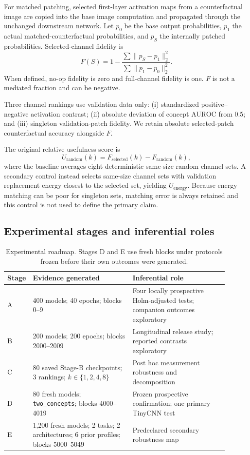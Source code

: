 \documentclass[10pt]{article}
\begin{document}
For matched patching, selected first-layer activation maps from a counterfactual image are copied into the base image computation and propagated through the unchanged downstream network. Let $p_0$ be the base output probabilities, $p_1$ the actual matched-counterfactual probabilities, and $p_S$ the internally patched probabilities. Selected-channel fidelity is
\[
F(S)=1-\frac{\sum\lVert p_S-p_1\rVert_2^2}
{\sum\lVert p_1-p_0\rVert_2^2}.
\]
When defined, no-op fidelity is zero and full-channel fidelity is one. $F$ is not a mediated fraction and can be negative.

Three channel rankings use validation data only: (i) standardized positive--negative activation contrast; (ii) absolute deviation of concept AUROC from 0.5; and (iii) singleton validation-patch fidelity. We retain absolute selected-patch counterfactual accuracy alongside $F$.

The original relative usefulness score is
\[
U_{\mathrm{random}}(k)=F_{\mathrm{selected}}(k)-F_{\mathrm{random}}(k),
\]
where the baseline averages eight deterministic same-size random channel sets. A secondary control instead selects same-size channel sets with validation replacement energy closest to the selected set, yielding $U_{\mathrm{energy}}$. Because energy matching can be poor for singleton sets, matching error is always retained and this control is not used to define the primary claim.

\subsection{Experimental stages and inferential roles}\label{sec:stages}

\begin{table}[t]
\centering
\footnotesize
\setlength{\tabcolsep}{4pt}
\begin{tabular}{@{}lp{0.46\linewidth}p{0.44\linewidth}@{}}
\toprule
Stage & Evidence generated & Inferential role \\
\midrule
A & 400 models; 40 epochs; blocks 0--9 & Four locally prospective Holm-adjusted tests; companion outcomes exploratory \\
B & 200 models; 200 epochs; blocks 2000--2009 & Longitudinal release study; reported contrasts exploratory \\
C & 80 saved Stage-B checkpoints; 3 rankings; $k\in\{1,2,4,8\}$ & Post hoc measurement robustness and decomposition \\
D & 80 fresh models; \texttt{two\_concepts}; blocks 4000--4019 & Frozen prospective confirmation; one primary TinyCNN test \\
E & 1,200 fresh models; 2 tasks; 2 architectures; 6 prior profiles; blocks 5000--5049 & Predeclared secondary robustness map \\
\bottomrule
\end{tabular}
\caption{Experimental roadmap. Stages D and E use fresh blocks under protocols frozen before their own outcomes were generated.}
\label{tab:stages}
\end{table}
\end{document}
